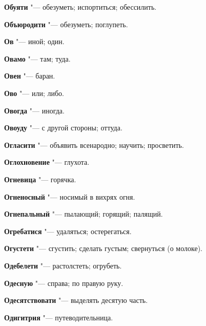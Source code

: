 \begin{mymulticols}{2}
\noindent\textbf{Обуяти} "--- обезуметь; испортиться; обессилить. 




\noindent\textbf{Объюродити} "--- обезуметь; поглупеть. 




\noindent\textbf{Ов} "--- иной; один. 




\noindent\textbf{Овамо} "--- там; туда. 




\noindent\textbf{Овен} "--- баран. 




\noindent\textbf{Ово} "--- или; либо. 




\noindent\textbf{Овогда} "--- иногда. 




\noindent\textbf{Овоуду} "--- с другой стороны; оттуда. 




\noindent\textbf{Огласити} "--- объявить всенародно; научить; просветить. 




\noindent\textbf{Оглохновение} "--- глухота. 




\noindent\textbf{Огневица} "--- горячка. 




\noindent\textbf{Огненосный} "--- носимый в вихрях огня. 




\noindent\textbf{Огнепальный} "--- пылающий; горящий; палящий. 




\noindent\textbf{Огребатися} "--- удаляться; остерегаться. 




\noindent\textbf{Огустети} "--- сгустить; сделать густым; свернуться (о молоке). 




\noindent\textbf{Одебелети} "--- растолстеть; огрубеть. 




\noindent\textbf{Одесную} "--- справа; по правую руку. 




\noindent\textbf{Одесятствовати} "--- выделять десятую часть. 




\noindent\textbf{Одигитрия} "--- путеводительница. 





\end{mymulticols}
